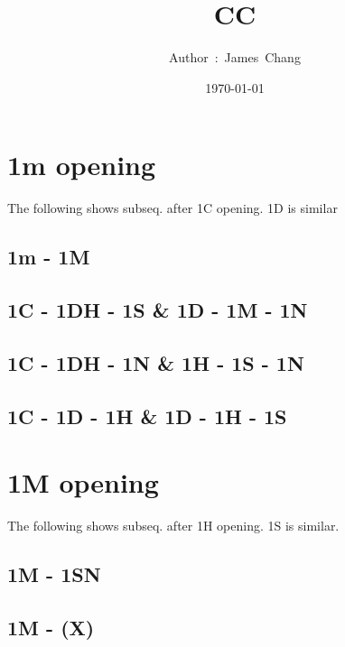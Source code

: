 

\title{CC}
\author{ {\Biohazard} \hspace{1.5mm} \hspace{1.5mm} Author\ :\ James\ Chang}
\date{\today}


\large
\tableofcontents

\newpage
\section{1m opening}

The following shows subseq. after 1C opening. 1D is similar

\subsection{1m - 1M}

\subsection{1C - 1DH - 1S \& 1D - 1M - 1N}

\subsection{1C - 1DH - 1N \& 1H - 1S - 1N}

\subsection{1C - 1D - 1H \& 1D - 1H - 1S}

\section{1M opening}

The following shows subseq. after 1H opening. 1S is similar.

\subsection{1M - 1SN}

\subsection{1M - (X)}

